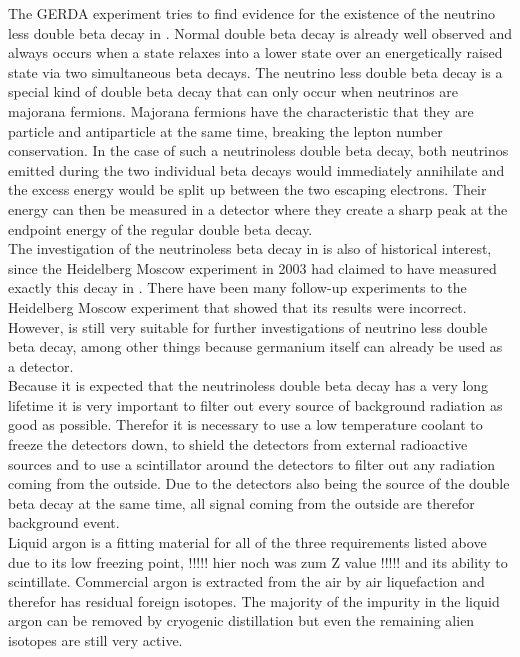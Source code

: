 \documentclass[encoding=utf8,british]{tumphthesis}
\begin{document}
The GERDA experiment tries to find evidence for the existence of the neutrino less double beta decay in .
Normal double beta decay is already well observed and always occurs when a state relaxes into a lower state over an energetically raised state via two simultaneous beta decays.
The neutrino less double beta decay is a special kind of double beta decay that can only occur when neutrinos are majorana fermions.
Majorana fermions have the characteristic that they are particle and antiparticle at the same time, breaking the lepton number conservation.
In the case of such a neutrinoless double beta decay, both neutrinos emitted during the two individual beta decays would immediately annihilate and the excess energy would be split up between the two escaping electrons.
Their energy can then be measured in a detector where they create a sharp peak at the endpoint energy of the regular double beta decay.
\\

The investigation of the neutrinoless beta decay in \Ge is also of historical interest, since the Heidelberg Moscow experiment in 2003 had claimed to have measured exactly this decay in \Ge.
There have been many follow-up experiments to the Heidelberg Moscow experiment that showed that its results were incorrect.
However, \Ge is still very suitable for further investigations of neutrino less double beta decay, among other things because germanium itself can already be used as a detector.
\\

Because it is expected that the neutrinoless double beta decay has a very long lifetime it is very important to filter out every source of background radiation as good as possible. 
Therefor it is necessary to use a low temperature coolant to freeze the  detectors down, to shield the detectors from external radioactive sources and to use a scintillator around the detectors to filter out any radiation coming from the outside. 
Due to the \Ge detectors also being the source of the double beta decay at the same time, all signal coming from the outside are therefor background event. 
\\

Liquid argon is a fitting material for all of the three requirements listed above due to its low freezing point, !!!!! hier noch was zum Z value !!!!! and its ability to scintillate. 
Commercial argon is extracted from the air by air liquefaction and therefor has residual foreign isotopes. 
The majority of the impurity in the liquid argon can be removed by cryogenic distillation but even the remaining alien isotopes are still very active.\\
\end{document}
